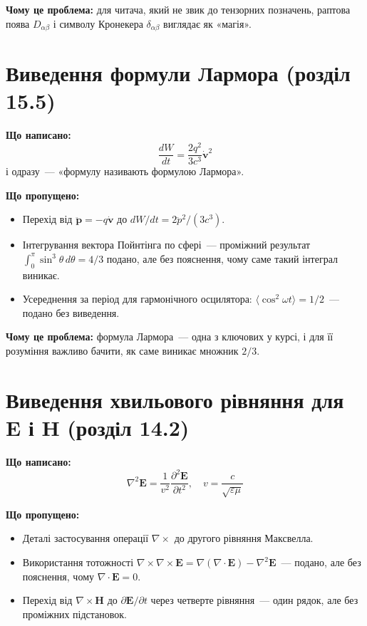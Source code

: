 \documentclass[11pt,a4paper]{article}
\begin{document}
\textbf{Чому це проблема:} для читача, який не звик до тензорних позначень, раптова поява \(D_{\alpha\beta}\) і символу Кронекера \(\delta_{\alpha\beta}\) виглядає як «магія».

\section{Виведення формули Лармора (розділ 15.5)}

\textbf{Що написано:}
\[
\frac{dW}{dt} = \frac{2q^2}{3c^3} \dot{\mathbf{v}}^2
\]
і одразу~--- «формулу називають формулою Лармора».

\textbf{Що пропущено:}
\begin{itemize}[nosep]
    \item Перехід від \(\ddot{\mathbf{p}} = -q\dot{\mathbf{v}}\) до \(dW/dt = 2\ddot{p}^2/(3c^3)\).
    \item Інтегрування вектора Пойнтінга по сфері~--- проміжний результат \(\int_0^\pi \sin^3\theta \, d\theta = 4/3\) подано, але без пояснення, чому саме такий інтеграл виникає.
    \item Усереднення за період для гармонічного осцилятора: \(\langle \cos^2 \omega t \rangle = 1/2\)~--- подано без виведення.
\end{itemize}

\textbf{Чому це проблема:} формула Лармора~--- одна з ключових у курсі, і для її розуміння важливо бачити, як саме виникає множник \(2/3\).

\section{Виведення хвильового рівняння для \(\mathbf{E}\) і \(\mathbf{H}\) (розділ 14.2)}

\textbf{Що написано:}
\[
\nabla^2 \mathbf{E} = \frac{1}{v^2} \frac{\partial^2 \mathbf{E}}{\partial t^2}, \quad v = \frac{c}{\sqrt{\varepsilon\mu}}
\]

\textbf{Що пропущено:}
\begin{itemize}[nosep]
    \item Деталі застосування операції \(\nabla \times\) до другого рівняння Максвелла.
    \item Використання тотожності \(\nabla \times \nabla \times \mathbf{E} = \nabla(\nabla \cdot \mathbf{E}) - \nabla^2 \mathbf{E}\)~--- подано, але без пояснення, чому \(\nabla \cdot \mathbf{E} = 0\).
    \item Перехід від \(\nabla \times \mathbf{H}\) до \(\partial \mathbf{E}/\partial t\) через четверте рівняння~--- один рядок, але без проміжних підстановок.
\end{itemize}
\end{document}
